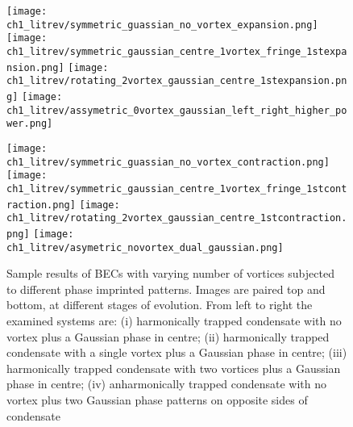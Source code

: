 \begin{figure}[tb]
\begin{center}
	\texttt{[image: ch1\_litrev/symmetric\_guassian\_no\_vortex\_expansion.png]}\vspace{0.1em}
	\texttt{[image: ch1\_litrev/symmetric\_gaussian\_centre\_1vortex\_fringe\_1stexpansion.png]}
	\texttt{[image: ch1\_litrev/rotating\_2vortex\_gaussian\_centre\_1stexpansion.png]}
	\texttt{[image: ch1\_litrev/assymetric\_0vortex\_gaussian\_left\_right\_higher\_power.png]}


	\texttt{[image: ch1\_litrev/symmetric\_guassian\_no\_vortex\_contraction.png]}
	\texttt{[image: ch1\_litrev/symmetric\_gaussian\_centre\_1vortex\_fringe\_1stcontraction.png]}
	\texttt{[image: ch1\_litrev/rotating\_2vortex\_gaussian\_centre\_1stcontraction.png]}
	\texttt{[image: ch1\_litrev/asymetric\_novortex\_dual\_gaussian.png]}
\end{center}\vspace*{0pt}\caption{Sample results of BECs with varying number of vortices subjected to different phase imprinted patterns. Images are paired top and bottom, at different stages of evolution. From left to right the examined systems are: (i) harmonically trapped condensate with no vortex plus a Gaussian phase in centre; (ii) harmonically trapped condensate with a single vortex plus a Gaussian phase in centre; (iii) harmonically trapped condensate with two vortices plus a Gaussian phase in centre; (iv) anharmonically trapped condensate with no vortex plus two Gaussian phase patterns on opposite sides of condensate\vspace*{-10pt}}\label{FIG:bec_fringe}
\end{figure}

